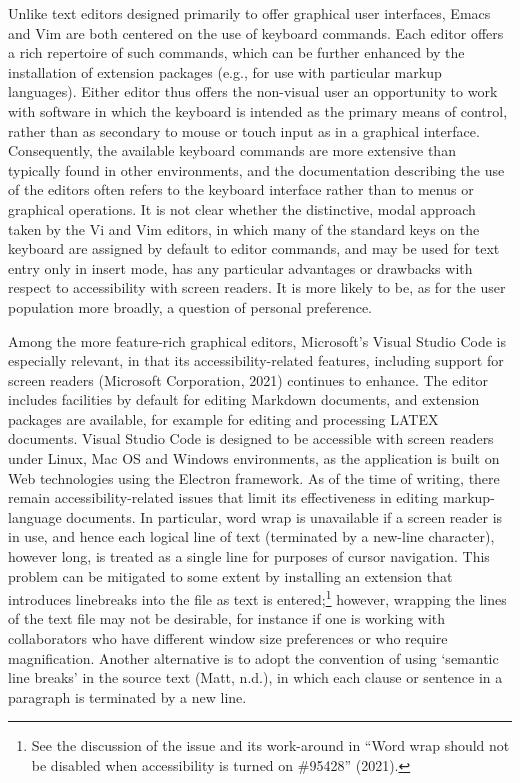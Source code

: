 \documentclass[11pt]{sig-alternate}
\begin{document}
\begin{large}
Unlike text editors designed primarily to offer graphical user interfaces, Emacs and Vim are both centered on the use of keyboard commands. Each editor offers a rich repertoire of such commands, which can be further enhanced by the installation of extension packages (e.g., for use with particular markup languages). Either editor thus offers the non-visual user an opportunity to work with software in which the keyboard is intended as the primary means of control, rather than as secondary to mouse or touch input as in a graphical interface. Consequently, the available keyboard commands are more extensive than typically found in other environments, and the documentation describing the use of the editors often refers to the keyboard interface rather than to menus or graphical operations. It is not clear whether the distinctive, modal approach taken by the Vi and Vim editors, in which many of the standard keys on the keyboard are assigned by default to editor commands, and may be used for text entry only in insert mode, has any particular advantages or drawbacks with respect to accessibility with screen readers. It is more likely to be, as for the user population more broadly, a question of personal preference.

Among the more feature-rich graphical editors, Microsoft’s Visual Studio Code is especially relevant, in that its accessibility-related features, including support for screen readers (Microsoft Corporation, 2021) continues to enhance. The editor includes facilities by default for editing Markdown documents, and extension packages are available, for example for editing and processing LATEX documents. Visual Studio Code is designed to be accessible with screen readers under Linux, Mac OS and Windows environments, as the application is built on Web technologies using the Electron framework. As of the time of writing, there remain accessibility-related issues that limit its effectiveness in editing markup-language documents. In particular, word wrap is unavailable if a screen reader is in use, and hence each logical line of text (terminated by a new-line character), however long, is treated as a single line for purposes of cursor navigation. This problem can be mitigated to some extent by installing an extension that introduces linebreaks into the file as text is entered;\footnote{See the discussion of the issue and its work-around in “Word wrap should not be disabled when accessibility is turned on \#95428” (2021).} however, wrapping the lines of the text file may not be desirable, for instance if one is working with collaborators who have different window size preferences or who require magnification. Another alternative is to adopt the convention of using ‘semantic line breaks’ in the source text (Matt, n.d.), in which each clause or sentence in a paragraph is terminated by a new line.


\end{large}
\end{document}

